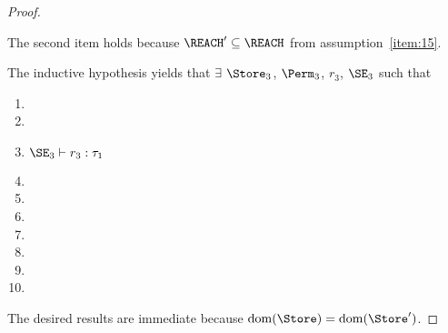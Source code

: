 \begin{proof}
\begin{enumerate}[({A1-}1)]
    The second item holds because $\REACH' \subseteq \REACH$ from
    assumption~\ref{item:15}.
  \end{enumerate}
  The inductive hypothesis yields that
    $\exists$ $\Store_3$, $\Perm_3$, $r_3$, $\SE_3$ such that
  \begin{enumerate}[({R1-}1)]
  \item {}
  \item {}
  \item $\SE_3 \vdash r_3 : \tau_1$
  \item {}
  \item {}
  \item {}
  \item {}
  \item {}
  \item {}
  \item {}
  \end{enumerate}
  The desired results are immediate because $\Dom\Store = \Dom{\Store'}$.
\end{proof}

